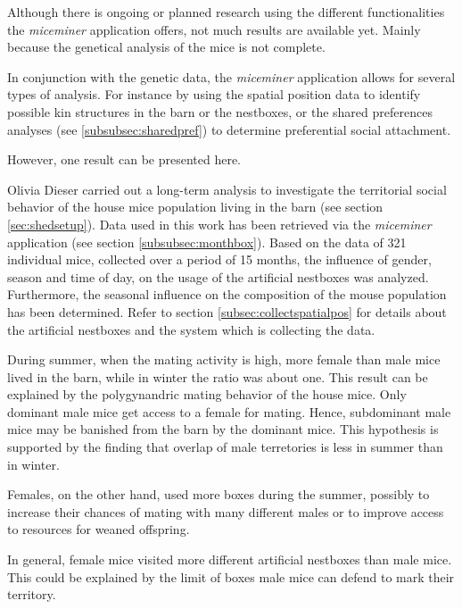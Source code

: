 Although there is ongoing or planned research using the different functionalities the \textit{miceminer} application offers, not much results are available yet. Mainly because the genetical analysis of the mice is not complete. 

In conjunction with the genetic data, the \textit{miceminer} application allows for several types of analysis. For instance by using the spatial position data to identify possible kin structures in the barn or the nestboxes, or the shared preferences analyses (see \ref{subsubsec:sharedpref}) to determine preferential social attachment. 

However, one result can be presented here.

Olivia Dieser \cite{dieser:08} carried out a long-term analysis to investigate the territorial social behavior of the house mice population living in the barn (see section \ref{sec:shedsetup}). Data used in this work has been retrieved via the \textit{miceminer} application (see section \ref{subsubsec:monthbox}). Based on the data of 321 individual mice, collected over a period of 15 months,  the influence of gender, season and time of day, on the usage of the artificial nestboxes was analyzed. Furthermore, the seasonal influence on the composition of the mouse population has been determined. Refer to section \ref{subsec:collectspatialpos} for details about the artificial nestboxes and the system which is collecting the data.

During summer, when the mating activity is high, more female than male mice lived in the barn, while in winter the ratio was about one. This result can be explained by the polygynandric mating behavior of the house mice. Only dominant male mice get access to a female for mating. Hence, subdominant male mice may be banished from the barn by the dominant mice. This hypothesis is supported by the finding that overlap of male terretories is less in summer than in winter. 

Females, on the other hand, used more boxes during the summer, possibly to increase their chances of mating with many different males or to improve access to resources for weaned offspring.

In general, female mice visited more different artificial nestboxes than male mice. This could be explained by the limit of boxes male mice can defend to mark their territory.